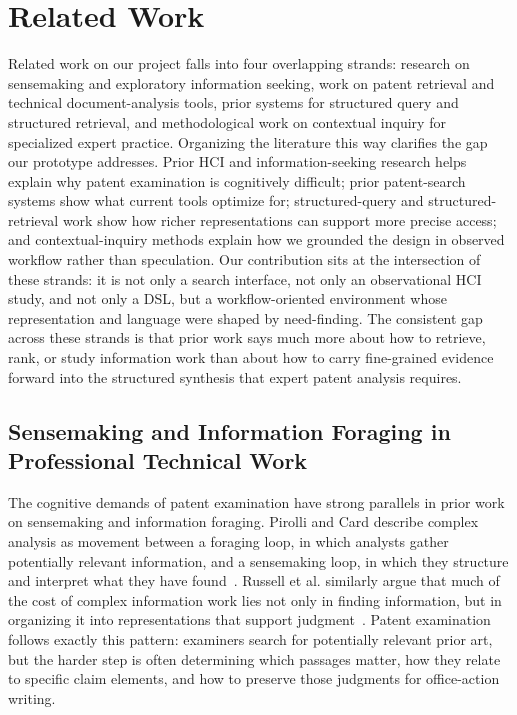 \documentclass[sigconf]{acmart}
\begin{document}
\section{Related Work}

Related work on our project falls into four overlapping strands: research on
sensemaking and exploratory information seeking, work on patent retrieval and
technical document-analysis tools, prior systems for structured query and
structured retrieval, and methodological work on contextual inquiry for
specialized expert practice. Organizing the literature this way clarifies the
gap our prototype addresses. Prior HCI and information-seeking research helps
explain why patent examination is cognitively difficult; prior patent-search
systems show what current tools optimize for; structured-query and
structured-retrieval work show how richer representations can support more
precise access; and contextual-inquiry methods explain how we grounded the
design in observed workflow rather than speculation. Our contribution sits at
the intersection of these strands: it is not only a search interface, not only
an observational HCI study, and not only a DSL, but a workflow-oriented
environment whose representation and language were shaped by need-finding. The
consistent gap across these strands is that prior work says much more about how
to retrieve, rank, or study information work than about how to carry
fine-grained evidence forward into the structured synthesis that expert patent
analysis requires.

\subsection{Sensemaking and Information Foraging in Professional Technical Work}

The cognitive demands of patent examination have strong parallels in prior work
on sensemaking and information foraging. Pirolli and Card describe complex
analysis as movement between a foraging loop, in which analysts gather
potentially relevant information, and a sensemaking loop, in which they
structure and interpret what they have found~\cite{Pirolli2005}. Russell
et al. similarly argue that much of the cost of complex information work lies
not only in finding information, but in organizing it into representations that
support judgment~\cite{Russell1993}. Patent examination follows exactly this
pattern: examiners search for potentially relevant prior art, but the harder
step is often determining which passages matter, how they relate to specific
claim elements, and how to preserve those judgments for office-action writing.
\end{document}
